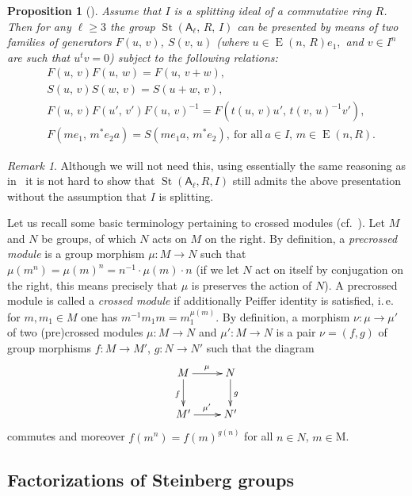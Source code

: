 \documentclass[oneside, 10pt]{amsart}
\DeclareMathOperator{\St}{St}
\DeclareMathOperator{\E}{E}
\newcommand{\rA}{\mathsf{A}}
\numberwithin{equation}{section}
\numberwithin{lemma}{section}
\newtheorem{prop}[lemma]{Proposition}
\theoremstyle{definition}
\theoremstyle{remark}
\newtheorem{rem}[lemma]{Remark}
\begin{document}
\begin{prop}[] \label{prop:rel-presentation}
 Assume that $I$ is a splitting ideal of a commutative ring $R$. 
 Then for any $\ell\geq 3$ the group $\St(\rA_\ell,\,R,\,I)$ can be presented by means of two families of generators $F(u,\,v)$, $S(v,\,u)$
  (where $u\in \E(n,\,R)e_1,$ and $v\in I^n$ are such that $u^tv=0$) subject to the following relations:
\begin{align}
&F(u,\,v)F(u,\,w)=F(u,\,v+w), \label{add4}\\
&S(u,\,v)S(w,\,v)=S(u+w,\,v), \label{add5}\\
&F(u,\,v)F(u',\,v')F(u,\,v)^{-1}=F(t(u,\,v)u',\,t(v,\,u)^{-1} v'), \label{conj3} \\
&F(me_1,\,m^*e_2a)=S(me_1a,\,m^*e_2),\ \text{for all}\ a\in I,\, m \in \E(n, R). \label{coef-move}
\end{align}
\end{prop}
\begin{rem}
Although we will not need this, using essentially the same reasoning as in~\cite[Proposition~8]{S15} it is not hard to show that 
$\St(\rA_\ell, R, I)$ still admits the above presentation without the assumption that $I$ is splitting.
\end{rem}

Let us recall some basic terminology pertaining to crossed modules (cf.~\cite[\S~3.3]{BHS11}). 
Let $M$ and $N$ be groups, of which $N$ acts on $M$ on the right.
By definition, a {\it precrossed module} is a group morphism $\mu \colon M \to N$ such that $\mu(m^n) = \mu(m)^n = n^{-1} \cdot \mu(m) \cdot n$
 (if we let $N$ act on itself by conjugation on the right, this means precisely that $\mu$ is preserves the action of $N$).
A precrossed module is called a {\it crossed module} if additionally Peiffer identity is satisfied, i.\,e. for $m, m_1\in M$ one has $m^{-1} m_1 m = m_1^{\mu(m)}$.
By definition, a morphism $\nu \colon \mu \to \mu'$ of two (pre)crossed modules $\mu \colon M \to N$ and $\mu'\colon M \to N$ is a pair $\nu=(f, g)$ of group morphisms 
 $f\colon M \to M'$, $g \colon N \to N'$ such that the diagram 
\begin{equation} \xymatrix{ M \ar[r]^{\mu} \ar[d]_{f} & N \ar[d]^{g} \\ M' \ar[r]^{\mu'} & N'}\end{equation} 
commutes and moreover $f(m^n) = f(m)^{g(n)}$ for all $n\in N$, $m\in $M. 


\subsection{Factorizations of Steinberg groups}
\end{document}
